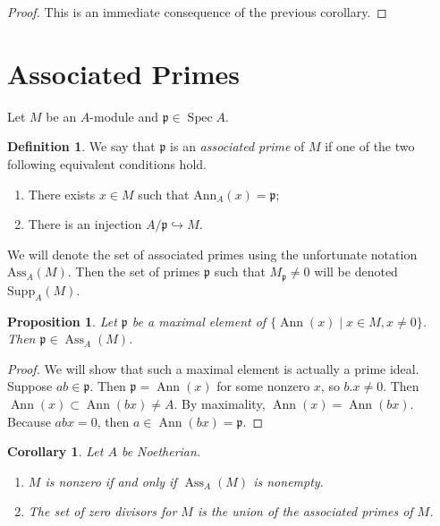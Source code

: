 \documentclass[leqno, openany]{memoir}
\newtheorem{cor}[thm]{Corollary}
\newtheorem{prop}[thm]{Proposition}
\theoremstyle{definition}
\newtheorem{defn}[thm]{Definition}
\theoremstyle{remark}
\theoremstyle{plain}
\theoremstyle{definition}
\theoremstyle{remark}
\newcommand{\mf}[1]{\mathfrak{#1}}
\newcommand{\mr}[1]{\mathrm{#1}}
\DeclareMathOperator{\Spec}{Spec}
\DeclareMathOperator{\Ann}{Ann}
\DeclareMathOperator{\Ass}{Ass}
\begin{document}
\begin{proof} This is an immediate consequence of the previous corollary.
\end{proof}

\section{Associated Primes}%

Let $M$ be an $A$-module and $\mf{p} \in \Spec A$.

\begin{defn} We say that $\mf{p}$ is an \textit{associated prime} of $M$ if one
    of the two following equivalent conditions hold.  \begin{enumerate} \item
        There exists $x \in M$ such that $\mr{Ann}_A(x) = \mf{p}$; \item There
        is an injection $A / \mf{p} \hookrightarrow M$.  \end{enumerate}
    \end{defn}

We will denote the set of associated primes using the unfortunate notation
$\mr{Ass}_A(M)$. Then the set of primes $\mf{p}$ such that $M_{\mf{p}} \neq 0$
will be denoted $\mr{Supp}_A(M)$.

\begin{prop} Let $\mf{p}$ be a maximal element of $\{ \Ann(x) \mid x \in M, x
\neq 0 \}$. Then $\mf{p} \in \Ass_A(M)$.  \end{prop}

\begin{proof} We will show that such a maximal element is actually a prime
    ideal. Suppose $ab \in \mf{p}$. Then $\mf{p} = \Ann(x)$ for some nonzero
    $x$, so $b.x \neq 0$. Then $\Ann(x) \subset \Ann(bx) \neq A$. By
    maximality, $\Ann(x) = \Ann(bx)$. Because $abx = 0$, then $a \in \Ann(bx) =
    \mf{p}$.  \end{proof}

\begin{cor} Let $A$ be Noetherian.  \begin{enumerate} \item $M$ is nonzero if
and only if $\Ass_A(M)$ is nonempty.  \item The set of zero divisors for $M$ is
the union of the associated primes of $M$.  \end{enumerate} \end{cor}
\end{document}
